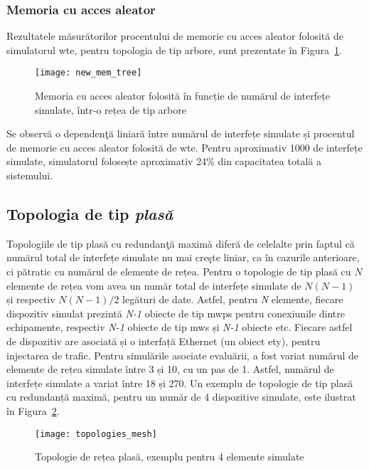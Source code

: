 \subsubsection{Memoria cu acces aleator}

Rezultatele măsurătorilor procentului de memorie cu acces aleator folosită de simulatorul \gls{wte}, pentru topologia de tip arbore, sunt prezentate în Figura~\ref{fig:new_mem_tree}.

\begin{figure}[h]
	\centering
	\texttt{[image: new\_mem\_tree]}
	\caption{Memoria cu acces aleator folosită în funcție de numărul de interfețe simulate, într-o rețea de tip arbore}
	\label{fig:new_mem_tree}
\end{figure}

Se observă o dependenţă liniară între numărul de interfețe simulate și procentul de memorie cu acces aleator folosită de \gls{wte}. Pentru aproximativ 1000 de interfețe simulate, simulatorul folosește aproximativ 24\% din capacitatea totală a sistemului.

\subsection{Topologia de tip \textit{plasă}}

Topologiile de tip plasă cu redundanţă maximă diferă de celelalte prin faptul că numărul total de interfețe simulate nu mai creşte liniar, ca în cazurile anterioare, ci pătratic cu numărul de elemente de rețea. Pentru o topologie de tip plasă cu $ N $ elemente de rețea vom avea un număr total de interfețe simulate de $ N(N-1) $ și respectiv $ N(N-1)/2 $ legături de date. Astfel, pentru \textit{N} elemente, fiecare dispozitiv simulat prezintă \textit{N-1} obiecte de tip \gls{mwps} pentru conexiunile dintre echipamente, respectiv \textit{N-1} obiecte de tip \gls{mws} și \textit{N-1} obiecte \gls{etc}. Fiecare astfel de dispozitiv are asociată și o interfață Ethernet (un obiect \gls{ety}), pentru injectarea de trafic. Pentru simulările asociate evaluării, a fost variat numărul de elemente de rețea simulate între 3 și 10, cu un pas de 1. Astfel, numărul de interfețe simulate a variat între 18 și 270. Un exemplu de topologie de tip plasă cu redundanță maximă, pentru un număr de 4 dispozitive simulate, este ilustrat în Figura~\ref{fig:topologies_mesh}.

\begin{figure}[h]
	\centering
	\texttt{[image: topologies\_mesh]}
	\caption{Topologie de rețea plasă, exemplu pentru 4 elemente simulate}
	\label{fig:topologies_mesh}
\end{figure}

